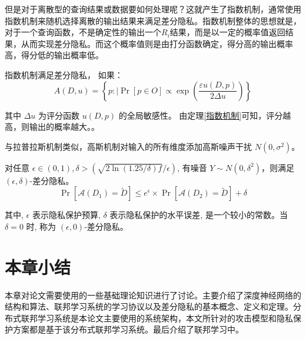 但是对于离散型的查询结果或数据要如何处理呢？这就产生了指数机制，通常使用指数机制来随机选择离散的输出结果来满足差分隐私。指数机制整体的思想就是，对于一个查询函数，不是确定性的输出一个$R_{i}$结果，而是以一定的概率值返回结果，从而实现差分隐私。而这个概率值则是由打分函数确定，得分高的输出概率高，得分低的输出概率低。

\begin{theorem}[指数机制]\label{指数机制}
指数机制满足差分隐私， 如果：
$$
A(D,u)=\left\{p: \mid \operatorname{Pr}[p \in O] \propto \exp \left(\frac{\varepsilon u(D,p)}{2 \Delta u}\right)\right\}
$$
\end{theorem}
其中 $\Delta u$ 为评分函数 $u(D,p)$ 的全局敏感性。 由定理\ref{指数机制}可知，评分越高，则输出的概率越大。。

与拉普拉斯机制类似，高斯机制对输入的所有维度添加高斯噪声干扰 $N\left(0,\sigma^{2}\right)$。
\begin{theorem}[高斯机制]\label{高斯机制}
对任意 $\epsilon \in(0,1), \delta>(\sqrt{2 \ln (1.25 / \delta) f} / \epsilon)$, 有噪音 $Y \sim N\left(0, \delta^{2}\right)$，则满足 $(\epsilon, \delta)$-差分隐私。
$$
\operatorname{Pr}\left[\mathscr{A}\left(D_{1}\right)=\tilde{D}\right] \leq e^{\epsilon} \times \operatorname{Pr}\left[\mathscr{A}\left(D_{2}\right)=\tilde{D}\right]+\delta
$$
\end{theorem}

其中, $\epsilon$ 表示隐私保护预算, $\delta$ 表示隐私保护的水平误差, 是一个较小的常数。当 $\delta=0$ 时, 称为 $(\epsilon, 0)$-差分隐私。

\section{本章小结}
本章对论文需要使用的一些基础理论知识进行了讨论。主要介绍了深度神经网络的结构和算法、联邦学习系统的学习协议以及差分隐私的基本概念、定义和定理。分布式联邦学习系统是本论文主要使用的系统架构，本文所针对的攻击模型和隐私保护方案都是基于该分布式联邦学习系统。最后介绍了联邦学习中。
